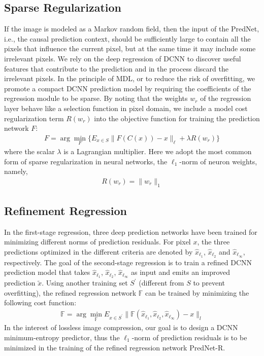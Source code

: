 \documentclass{article}
\begin{document}
\subsection{Sparse Regularization}
If the image is modeled as a Markov random field, then the input of the PredNet, i.e., the causal prediction context, should be sufficiently large to contain all the pixels that influence the current pixel, but at the same time it may include some irrelevant pixels.
We rely on the deep regression of DCNN to discover useful features that contribute to the prediction and in the process discard the irrelevant pixels.  In the principle of MDL, or to reduce the risk of overfitting, we promote a compact DCNN prediction model by requiring the coefficients of the regression module to be sparse.  By noting that the weights $w_r$ of the regression layer behave like a selection function in pixel domain, we include a model cost regularization term $R(w_r)$ into the objective function for training the prediction network $F$:
\begin{align}
	F = \arg \min_F
		\bigg\{
				E_{x\in S} \| F(C(x)) - x \|_\ell
						+ \lambda R(w_{r})
		\bigg\}
\end{align}
where the scalar $\lambda$ is a Lagrangian multiplier.  Here we adopt the most common form of sparse regularization in neural networks, the $\ell_1$-norm of neuron weights, namely,
\begin{align}
	R(w_r) = \| w_r \|_1
\end{align}

\subsection{Refinement Regression}
In the first-stage regression, three deep prediction networks have been trained for minimizing different norms of prediction residuals.
For pixel $x$, the three predictions optimized in the different criteria are denoted by $\hat{x}_{\ell_1}$, $\hat{x}_{\ell_2}$ and $\hat{x}_{\ell_\infty}$, respectively.
The goal of the second-stage regression is to train a refined DCNN prediction model that takes $\hat{x}_{\ell_1}$, $\hat{x}_{\ell_2}$, $\hat{x}_{\ell_\infty}$ as input and emits an improved prediction $\tilde{x}$.
Using another training set $S^{'}$ (different from $S$ to prevent overfitting), the refined regression network $\mathbb{F}$ can be trained by minimizing the following cost function:
\begin{align}
	\mathbb{F} = \arg \min_\mathbb{F} E_{x\in S^{'}}
		\|
		\mathbb{F}(\hat{x}_{\ell_1}, \hat{x}_{\ell_2}, \hat{x}_{\ell_\infty})
		- x
		\|_l
\end{align}
In the interest of lossless image compression, our goal is to design a DCNN minimum-entropy predictor, thus the $\ell_1$-norm of prediction residuals is to be minimized in the training of the refined regression network PredNet-R.
\end{document}
